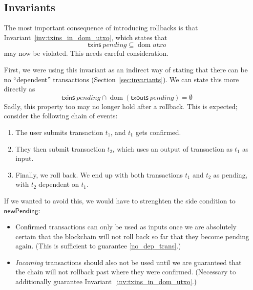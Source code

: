 \documentclass{article}
\DeclareMathOperator{\dom}{dom}
\begin{document}
\clearpage






\subsection{Invariants}

The most important consequence of introducing rollbacks is that
Invariant~\ref{inv:txins_in_dom_utxo}, which states that
%
\begin{equation*}
\mathsf{txins} ~ pending \subseteq \dom utxo
\end{equation*}
%
may now be violated. This needs careful consideration.

First, we were using this invariant as an indirect way of stating that there
can be no ``dependent'' transactions (Section~\ref{sec:invariants}). We can
state this more directly as
%
\begin{equation} \label{no_dep_trans}
\mathsf{txins} ~ \mathit{pending} \cap \dom (\mathsf{txouts} ~ \mathit{pending}) = \emptyset
\end{equation}
%
Sadly, this property too may no longer hold after a rollback. This is expected;
consider the following chain of events:
%
\begin{enumerate}
\item The user submits transaction $t_1$, and $t_1$ gets confirmed.
\item They then submit transaction $t_2$, which uses an output of transaction as $t_1$ as input.
\item Finally, we roll back. We end up with both transactions $t_1$ and $t_2$ as pending, with $t_2$ dependent on $t_1$.
\end{enumerate}

If we wanted to avoid this, we would have to strenghten the side condition to
$\mathsf{newPending}$:

\begin{itemize}
\item Confirmed transactions can only be used as inputs once we are absolutely
certain that the blockchain will not roll back so far that they become pending
again. (This is sufficient to guarantee \eqref{no_dep_trans}.)
\item \emph{Incoming} transactions should also not be used until we are guaranteed
that the chain will not rollback past where they were confirmed. (Necessary to
additionally guarantee Invariant~\ref{inv:txins_in_dom_utxo}.)
\end{itemize}
\end{document}
